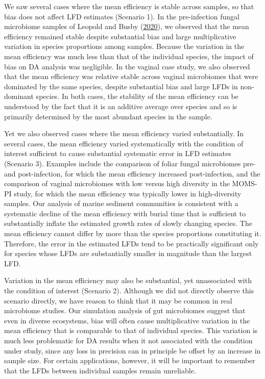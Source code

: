 \documentclass[
]{article}
\begin{document}
We saw several cases where the mean efficiency is stable across samples, so that bias does not affect LFD estimates (Scenario 1).
In the pre-infection fungal microbiome samples of Leopold and Busby (\protect\hyperlink{ref-leopold2020host}{2020}), we observed that the mean efficiency remained stable despite substantial bias and large multiplicative variation in species proportions among samples.
Because the variation in the mean efficiency was much less than that of the individual species, the impact of bias on DA analysis was negligible.
In the vaginal case study, we also observed that the mean efficiency was relative stable across vaginal microbiomes that were dominated by the same species, despite substantial bias and large LFDs in non-dominant species.
In both cases, the stability of the mean efficiency can be understood by the fact that it is an additive average over species and so is primarily determined by the most abundant species in the sample.

Yet we also observed cases where the mean efficiency varied substantially.
In several cases, the mean efficiency varied systematically with the condition of interest sufficient to cause substantial systematic error in LFD estimates (Scenario 3).
Examples include the comparison of foliar fungal microbiomes pre- and post-infection, for which the mean efficiency increased post-infection, and the comparison of vaginal microbiomes with low versus high diversity in the MOMS-PI study, for which the mean efficiency was typically lower in high-diversity samples.
Our analysis of marine sediment communities is consistent with a systematic decline of the mean efficiency with burial time that is sufficient to substantially inflate the estimated growth rates of slowly changing species.
The mean efficiency cannot differ by more than the species proportions constituting it.
Therefore, the error in the estimated LFDs tend to be practically significant only for species whose LFDs are substantially smaller in magnitude than the largest LFD.

Variation in the mean efficiency may also be substantial, yet unassociated with the condition of interest (Scenario 2).
Although we did not directly observe this scenario directly, we have reason to think that it may be common in real microbiome studies.
Our simulation analysis of gut microbiomes suggest that even in diverse ecosystems, bias will often cause multiplicative variation in the mean efficiency that is comparable to that of individual species.
This variation is much less problematic for DA results when it not associated with the condition under study, since any loss in precision can in principle be offset by an increase in sample size.
For certain applications, however, it will be important to remember that the LFDs between individual samples remain unreliable.
\end{document}
